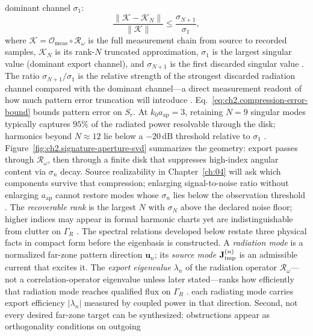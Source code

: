 dominant channel $\sigma_1$:
\begin{equation}
\label{eq:ch2.signature-aperture-truncation}
\frac{\|\mathcal{K}-\mathcal{K}_N\|}{\|\mathcal{K}\|}
\le
\frac{\sigma_{N+1}}{\sigma_1},
\end{equation}
where $\mathcal{K}=\mathcal{O}_{\mathrm{meas}}\circ\mathcal{R}_\omega$ is the full measurement
chain from source to recorded samples, $\mathcal{K}_N$ is its rank-$N$ truncated approximation,
$\sigma_1$ is the largest singular value (dominant export channel), and $\sigma_{N+1}$ is the
first discarded singular value \cite{harrington2001}. The ratio $\sigma_{N+1}/\sigma_1$ is the
relative strength of the strongest discarded radiation channel compared with the dominant
channel---a direct measurement readout of how much pattern error truncation will introduce
\cite{hansen1988}. Eq.~\eqref{eq:ch2.compression-error-bound} bounds pattern error on \(S_r\). At
\(k_0 a_{\mathrm{ap}}=3\), retaining \(N=9\) singular modes typically captures \(95\%\)
of the radiated power resolvable through the disk; harmonics beyond \(N\approx 12\) lie
below a \(-20\,\mathrm{dB}\) threshold relative to \(\sigma_1\)
\cite{harrington2001}.
Figure~\ref{fig:ch2.signature-aperture-svd} summarizes the geometry: export passes through
$\mathcal{R}_\omega$, then through a finite disk that suppresses high-index angular content via
$\sigma_n$ decay. Source realizability in Chapter~\ref{ch:04} will ask which components survive
that compression; enlarging signal-to-noise ratio without enlarging $a_{\mathrm{ap}}$ cannot
restore modes whose $\sigma_n$ lies below the observation threshold \cite{devaney2004,hansen1988}.
The \emph{recoverable rank} is the largest $N$ with $\sigma_N$ above the declared noise floor;
higher indices may appear in formal harmonic charts yet are indistinguishable from clutter on
$\Gamma_R$ \cite{chu1948,stratton1941}.
The spectral relations developed below restate three physical facts in compact form before the eigenbasis is
constructed. A \emph{radiation mode} is a normalized far-zone pattern direction
$\mathbf{u}_n$; its \emph{source mode} $\mathbf{J}_{\mathrm{imp}}^{(n)}$ is an admissible current that excites it.
The \emph{export eigenvalue} $\lambda_n$ of the radiation operator $\mathcal{R}_\omega$---not a
correlation-operator eigenvalue unless later stated---ranks how efficiently that radiation mode
reaches qualified flux on $\Gamma_R$ \cite{stratton1941}. each radiating mode carries export efficiency
$|\lambda_n|$ measured by coupled power in that direction. Second, not every desired far-zone
target can be synthesized: obstructions appear as orthogonality conditions on outgoing

